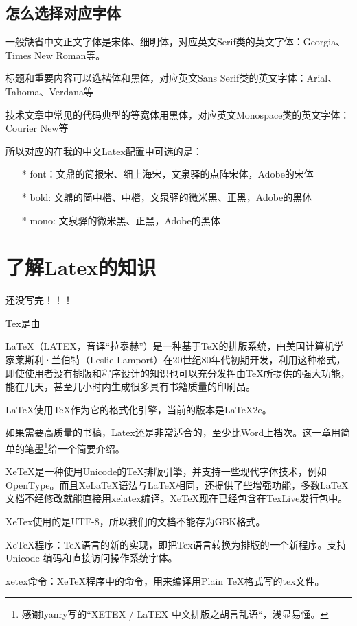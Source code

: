 \documentclass[a4paper]{book}
\newcommand{\chap}[1]{\newpage\thispagestyle{empty}\chapter{#1}\label{chap:\thechapter}}
\begin{document}
\section{怎么选择对应字体}

一般缺省中文正文字体是宋体、细明体，对应英文Serif类的英文字体：Georgia、Times New Roman等。

标题和重要内容可以选楷体和黑体，对应英文Sans Serif类的英文字体：Arial、Tahoma、Verdana等

技术文章中常见的代码典型的等宽体用黑体，对应英文Monospace类的英文字体：Courier New等

所以对应的在\href{https://github.com/larrycai/sdcamp/blob/master/latex/config.yml}{我的中文Latex配置}中可选的是：

\begin{itemize}\setlength{\itemsep}{1pt}\setlength{\parskip}{0pt}\setlength{\parsep}{0pt}
\item[*]
  font：文鼎的简报宋、细上海宋，文泉驿的点阵宋体，Adobe的宋体
\item[*]
  bold: 文鼎的简中楷、中楷，文泉驿的微米黑、正黑，Adobe的黑体
\item[*]
  mono: 文泉驿的微米黑、正黑，Adobe的黑体
\end{itemize}
\chap{了解Latex的知识}

还没写完！！！

Tex是由

LaTeX（LATEX，音译“拉泰赫”）是一种基于TeX的排版系统，由美国计算机学家莱斯利·兰伯特（Leslie Lamport）在20世纪80年代初期开发，利用这种格式，即使使用者没有排版和程序设计的知识也可以充分发挥由TeX所提供的强大功能，能在几天，甚至几小时内生成很多具有书籍质量的印刷品。

LaTeX使用TeX作为它的格式化引擎，当前的版本是LaTeX2e。

如果需要高质量的书稿，Latex还是非常适合的，至少比Word上档次。这一章用简单的笔墨\footnote{感谢lyanry写的``XETEX / LaTEX 中文排版之胡言乱语``，浅显易懂。}给一个简要介绍。

XeTeX是一种使用Unicode的TeX排版引擎，并支持一些现代字体技术，例如OpenType。而且XeLaTeX语法与LaTeX相同，还提供了些增强功能，多数LaTeX文档不经修改就能直接用xelatex编译。XeTeX现在已经包含在TexLive发行包中。

XeTex使用的是UTF-8，所以我们的文档不能存为GBK格式。

XeTeX程序：TeX语言的新的实现，即把Tex语言转换为排版的一个新程序。支持Unicode 编码和直接访问操作系统字体。

xetex命令：XeTeX程序中的命令，用来编译用Plain TeX格式写的tex文件。
\end{document}
